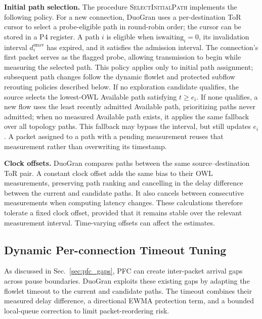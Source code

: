 \documentclass[10pt,journal,compsoc]{IEEEtran}
\begin{document}
\noindent
\textbf{Initial path selection.} The procedure \textsc{SelectInitialPath} implements the following policy. For a new connection, DuoGran uses a per-destination ToR cursor to select a probe-eligible path in round-robin order; the cursor can be stored in a P4 register. A path $i$ is eligible when $\mathrm{iswaiting}_i=0$, its invalidation interval $d_i^{\mathrm{unav}}$ has expired, and it satisfies the admission interval. The connection's first packet serves as the flagged probe, allowing transmission to begin while measuring the selected path. This policy applies only to initial path assignment; subsequent path changes follow the dynamic flowlet and protected subflow rerouting policies described below. If no exploration candidate qualifies, the source selects the lowest-OWL Available path satisfying $t\geq e_i$. If none qualifies, a new flow uses the least recently admitted Available path, prioritizing paths never admitted; when no measured Available path exists, it applies the same fallback over all topology paths. This fallback may bypass the interval, but still updates $e_i$. A packet assigned to a path with a pending measurement reuses that measurement rather than overwriting its timestamp.

\noindent
\textbf{Clock offsets.} DuoGran compares paths between the same source--destination ToR pair. A constant clock offset adds the same bias to their OWL measurements, preserving path ranking and cancelling in the delay difference between the current and candidate paths. It also cancels between consecutive measurements when computing latency changes. These calculations therefore tolerate a fixed clock offset, provided that it remains stable over the relevant measurement interval. Time-varying offsets can affect the estimates.

\subsection{Dynamic Per-connection Timeout Tuning}
\label{sec:dynamic_timeout}
As discussed in Sec.~\ref{sec:pfc_gaps}, PFC can create inter-packet arrival gaps across pause boundaries. DuoGran exploits these existing gaps by adapting the flowlet timeout to the current and candidate paths. The timeout combines their measured delay difference, a directional EWMA protection term, and a bounded local-queue correction to limit packet-reordering risk.
\end{document}
